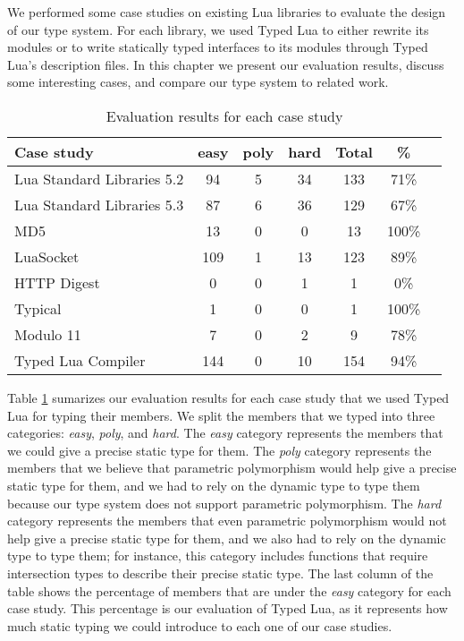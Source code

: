 
We performed some case studies on existing Lua libraries
to evaluate the design of our type system.
For each library, we used Typed Lua to either rewrite its modules
or to write statically typed interfaces to its modules through
Typed Lua's description files.
In this chapter we present our evaluation results, discuss
some interesting cases, and compare our type system to
related work.

\begin{table}[!ht]
\begin{center}
\begin{tabular}{|l|c|c|c|c|c|c|}
\hline
\textbf{Case study} & \textbf{easy} & \textbf{poly} & \textbf{hard} & \textbf{Total} & \textbf{\%} \\
\hline
Lua Standard Libraries 5.2 & 94 & 5 & 34 & 133 & 71\% \\
\hline
Lua Standard Libraries 5.3 & 87 & 6 & 36 & 129 & 67\% \\
\hline
MD5 & 13 & 0 & 0 & 13 & 100\% \\
\hline
LuaSocket & 109 & 1 & 13 & 123 & 89\% \\
\hline
HTTP Digest & 0 & 0 & 1 & 1 & 0\% \\
\hline
Typical & 1 & 0 & 0 & 1 & 100\% \\
\hline
Modulo 11 & 7 & 0 & 2 & 9 & 78\% \\
\hline
Typed Lua Compiler & 144 & 0 & 10 & 154 & 94\% \\
\hline
\end{tabular}
\end{center}
\caption{Evaluation results for each case study}
\label{tab:evalbycase}
\end{table}

Table \ref{tab:evalbycase} sumarizes our evaluation results for each
case study that we used Typed Lua for typing their members.
We split the members that we typed into three categories:
\emph{easy}, \emph{poly}, and \emph{hard}.
The \emph{easy} category represents the members that we could give
a precise static type for them.
The \emph{poly} category represents the members that we believe that
parametric polymorphism would help give a precise static type for them,
and we had to rely on the dynamic type to type them because our
type system does not support parametric polymorphism.
The \emph{hard} category represents the members that even parametric
polymorphism would not help give a precise static type for them,
and we also had to rely on the dynamic type to type them;
for instance, this category includes functions that require
intersection types to describe their precise static type.
The last column of the table shows the percentage of members that
are under the \emph{easy} category for each case study.
This percentage is our evaluation of Typed Lua, as it
represents how much static typing we could introduce to each one of
our case studies.

